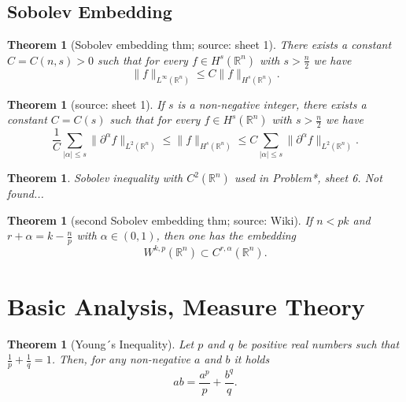 \documentclass[12pt,a4paper]{article}
\newtheorem{thm}[definition]{Theorem}
\newcommand{\Rn}{\mathbb{R}^n}
\begin{document}
\subsection{Sobolev Embedding}

\begin{thm}[Sobolev embedding thm; source: sheet 1]
There exists a constant $C=C(n,s)>0$ such that for every $f\in H^s(\mathbb{R}^n)$ with $s>\frac{n}{2}$ we have
\begin{equation}
\lVert f \rVert_{L^{\infty}(\mathbb{R}^n)} \leq C \lVert f \rVert _{H^s(\mathbb{R}^n)}.
\end{equation}
\end{thm}

\begin{thm}[source: sheet 1]
If $s$ is a non-negative integer, there exists a constant $C=C(s)$ such that for every $f\in H^s(\mathbb{R}^n)$ with $s>\frac{n}{2}$ we have
\begin{equation}
\frac{1}{C} \sum_{\lvert\alpha\rvert\leq s} \lVert \partial ^{\alpha} f \rVert_{L^2(\mathbb{R}^n)} \leq \lVert f \rVert _{H^s(\mathbb{R}^n)} \leq C \sum_{\lvert\alpha\rvert\leq s} \lVert \partial ^{\alpha} f \rVert_{L^2(\mathbb{R}^n)}.
\end{equation}
\end{thm}

\begin{thm}
Sobolev inequality with $C^2(\Rn)$ used in Problem*, sheet 6. Not found...
\end{thm}

\begin{thm}[second Sobolev embedding thm; source: Wiki]
If $n<pk$ and $r+\alpha=k-\frac{n}{p}$ with $\alpha \in (0,1)$, then one has the embedding
\begin{equation}
W^{k,p}(\mathbb{R}^n) \subset C^{r,\alpha}(\mathbb{R}^n).
\end{equation}
\end{thm}


\section{Basic Analysis, Measure Theory}

\begin{thm}[Young´s Inequality]
Let $p$ and $q$ be positive real numbers such that $\frac{1}{p} + \frac{1}{q} = 1$. Then, for any non-negative $a$ and $b$ it holds
\begin{equation}
ab=\frac{a^p}{p}+\frac{b^q}{q}.
\end{equation}
\end{thm}
\end{document}
